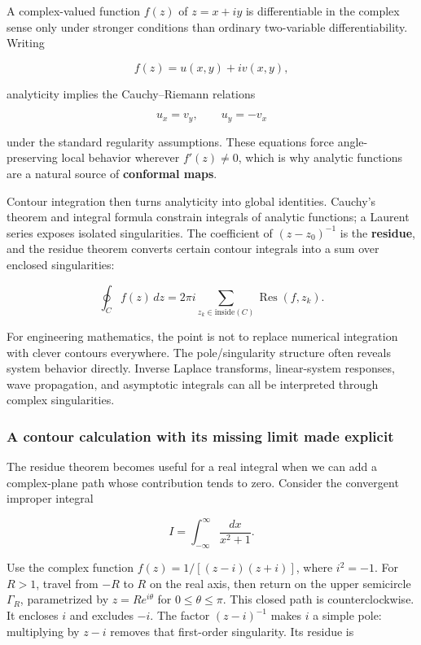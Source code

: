 \hypertarget{02-foundations-ii-ch025-complex-analysis-explains-why-conformal-maps-residues-and-asymptotic-integrals-share-one-language}{}

A complex-valued function \(f(z)\) of \(z=x+iy\) is differentiable in the complex sense only under stronger conditions than ordinary two-variable differentiability. Writing

\[
f(z)=u(x,y)+iv(x,y),
\]

analyticity implies the Cauchy--Riemann relations

\[
u_x=v_y,\qquad u_y=-v_x
\]

under the standard regularity assumptions. These equations force angle-preserving local behavior wherever \(f'(z)\neq0\), which is why analytic functions are a natural source of \textbf{conformal maps}.

Contour integration then turns analyticity into global identities. Cauchy's theorem and integral formula constrain integrals of analytic functions; a Laurent series exposes isolated singularities. The coefficient of \((z-z_0)^{-1}\) is the \textbf{residue}, and the residue theorem converts certain contour integrals into a sum over enclosed singularities:

\[
\oint_C f(z)\,dz
=
2\pi i
\sum_{z_k\in\mathrm{inside}(C)}
\operatorname{Res}(f,z_k).
\]

For engineering mathematics, the point is not to replace numerical integration with clever contours everywhere. The pole/singularity structure often reveals system behavior directly. Inverse Laplace transforms, linear-system responses, wave propagation, and asymptotic integrals can all be interpreted through complex singularities.

\subsubsection{A contour calculation with its missing limit made explicit}\label{02-foundations-ii-ch025-a-contour-calculation-with-its-missing-limit-made-explicit}

\hypertarget{02-foundations-ii-ch025-a-contour-calculation-with-its-missing-limit-made-explicit}{}

The residue theorem becomes useful for a real integral when we can add a complex-plane path whose contribution tends to zero. Consider the convergent improper integral

\[
I=\int_{-\infty}^{\infty}\frac{dx}{x^2+1}.
\]

Use the complex function \(f(z)=1/[(z-i)(z+i)]\), where \(i^2=-1\). For \(R>1\), travel from \(-R\) to \(R\) on the real axis, then return on the upper semicircle \(\Gamma_R\), parametrized by \(z=Re^{i\theta}\) for \(0\leq\theta\leq\pi\). This closed path is counterclockwise. It encloses \(i\) and excludes \(-i\). The factor \((z-i)^{-1}\) makes \(i\) a simple pole: multiplying by \(z-i\) removes that first-order singularity. Its residue is

